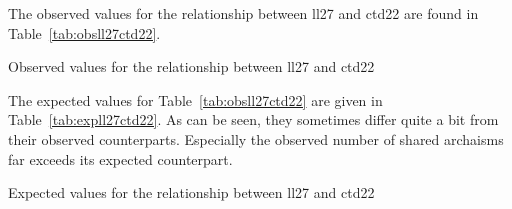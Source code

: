 The observed values for the relationship between \gls{ll27} and \gls{ctd22} are found in Table~\ref{tab:obsll27ctd22}. 

\begin{table}[h]
  \centering
  
  \caption{Observed values for the relationship between \gls{ll27} and \gls{ctd22}}
  \label{tab:obsll27ctd22}
\end{table}






The expected values for Table~\ref{tab:obsll27ctd22} are given in Table~\ref{tab:expll27ctd22}. As can be seen, they sometimes differ quite a bit from their observed counterparts. Especially the observed number of shared archaisms far exceeds its expected counterpart. 

\begin{table}[h]
  \centering
  
  \caption{Expected values for the relationship between \gls{ll27} and \gls{ctd22}}
  \label{tab:expll27ctd22}
\end{table}


